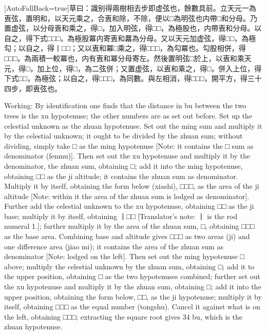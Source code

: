 \documentclass[11pt]{article}
\newcommand{\zhsmall}{\footnotesize\color{black!70}}
\newcommand{\unitlabel}[1]{\marginpar{\raggedleft\tiny\color{gray}#1}}
\newenvironment{unitzh}{\par\CJKfontspec{Noto Serif CJK SC}[AutoFallBack=true]\large\linespread{1.25}\selectfont}{\par}
\newenvironment{uniten}{\par\small\color{black!85}}{\par\medskip}
\begin{document}
\begin{unitzh}\unitlabel{ceyuan-023.10}草曰：識别得兩樹相去步即虚弦也，餘數具前。立天元一為叀弦，置明和，以天元乘之，合叀和除，不除，便以□為明弦也{\zhsmall 内帶□和分母}。乃置虚弦，以分母叀和乘之，得□，加入明弦，得□□，為極股也，内帶叀和分母。以自之，得下式□□□，為極股冪{\zhsmall 内寄叀和羃為分母}。又以天元加虚弦，得□□，為極勾；以自之，得丨□□；又以叀和冪□乘之，得□□□，為勾冪也。勾股相併，得□□□，為兩積一較冪也，内有叀和冪分母{\zhsmall 寄左}。然後置明弦□於上，以叀和乘天元，得□，加上位，得□，為二弦併；又置虚弦，以叀和乘之，得□，併入上位，得下式□□，為極弦；以自之，得□□□，為同數。與左相消，得□□□，開平方，得三十四步，即叀弦也。\end{unitzh}
\begin{uniten}Working: By identification one finds that the distance in bu between the two trees is the xu hypotenuse; the other numbers are as set out before. Set up the celestial unknown as the zhuan hypotenuse. Set out the ming sum and multiply it by the celestial unknown; it ought to be divided by the zhuan sum; without dividing, simply take □ as the ming hypotenuse [Note: it contains the □ sum as denominator (fenmu)]. Then set out the xu hypotenuse and multiply it by the denominator, the zhuan sum, obtaining □; add it into the ming hypotenuse, obtaining □□ as the ji altitude; it contains the zhuan sum as denominator. Multiply it by itself, obtaining the form below (xiashi), □□□, as the area of the ji altitude [Note: within it the area of the zhuan sum is lodged as denominator]. Further add the celestial unknown to the xu hypotenuse, obtaining □□ as the ji base; multiply it by itself, obtaining 丨□□ [Translator's note: 丨 is the rod numeral 1.]; further multiply it by the area of the zhuan sum, □, obtaining □□□ as the base area. Combining base and altitude gives □□□ as two areas (ji) and one difference area (jiao mi); it contains the area of the zhuan sum as denominator [Note: lodged on the left]. Then set out the ming hypotenuse □ above; multiply the celestial unknown by the zhuan sum, obtaining □; add it to the upper position, obtaining □ as the two hypotenuses combined; further set out the xu hypotenuse and multiply it by the zhuan sum, obtaining □; add it into the upper position, obtaining the form below, □□, as the ji hypotenuse; multiply it by itself, obtaining □□□ as the equal number (tongshu). Cancel it against what is on the left, obtaining □□□; extracting the square root gives 34 bu, which is the zhuan hypotenuse.\end{uniten}
\end{document}
